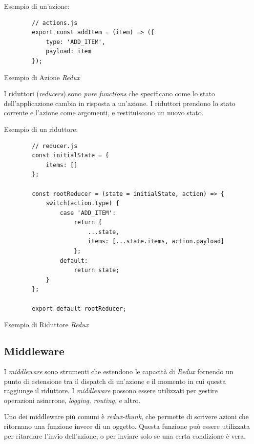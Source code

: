 Esempio di un'azione:
\begin{listing}[H]
    \begin{verbatim}
        // actions.js
        export const addItem = (item) => ({
            type: 'ADD_ITEM',
            payload: item
        });
    \end{verbatim}
    \caption{Esempio di Azione \textit{Redux}}
    \label{listing:azione}
\end{listing}

I riduttori (\textit{reducers}) sono \textit{pure functions} che specificano come lo stato dell'applicazione cambia in risposta a un'azione.
I riduttori prendono lo stato corrente e l'azione come argomenti, e restituiscono un nuovo stato.

Esempio di un riduttore:
\begin{listing}[H]
    \begin{verbatim}
        // reducer.js
        const initialState = {
            items: []
        };

        const rootReducer = (state = initialState, action) => {
            switch(action.type) {
                case 'ADD_ITEM':
                    return {
                        ...state,
                        items: [...state.items, action.payload]
                    };
                default:
                    return state;
            }
        };

        export default rootReducer;
    \end{verbatim}
    \caption{Esempio di Riduttore \textit{Redux}}
    \label{listing:riduttore}
\end{listing}

\subsection{Middleware}
\label{subsubsec:middleware}

I \textit{middleware} sono strumenti che estendono le capacità di \textit{Redux} fornendo un punto di estensione tra il dispatch di un'azione e il momento in cui questa raggiunge il riduttore.
I \textit{middleware} possono essere utilizzati per gestire operazioni asincrone, \textit{logging, routing,} e altro.

Uno dei middleware più comuni è \textit{redux-thunk}, che permette di scrivere azioni che ritornano una funzione invece di un oggetto.
Questa funzione può essere utilizzata per ritardare l'invio dell'azione, o per inviare solo se una certa condizione è vera.


